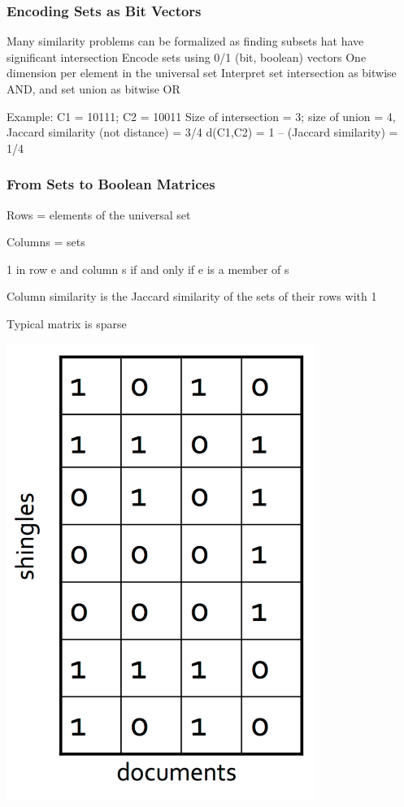 \documentclass[svgnames]{beamer}
\begin{document}
  
\begin{frame} \frametitle{Encoding Sets as Bit Vectors}

Many similarity problems can be formalized as finding subsets hat have significant intersection
  Encode sets using 0/1 (bit, boolean) vectors
  One dimension per element in the universal set
  Interpret set intersection as bitwise AND, and set union as bitwise OR

Example: C1 = 10111; C2 = 10011
  Size of intersection = 3; size of union = 4, Jaccard similarity (not distance) = 3/4
  d(C1,C2) = 1 – (Jaccard similarity) = 1/4
  
\end{frame}

  
\begin{frame} \frametitle{From Sets to Boolean Matrices}

Rows = elements of the universal set

Columns = sets

1 in row e and column s if and only if e is a member of s

Column similarity is the Jaccard similarity of the sets of their rows with 1

Typical matrix is sparse

\includegraphics[width=10cm]{matrix}

\end{frame}
\end{document}
